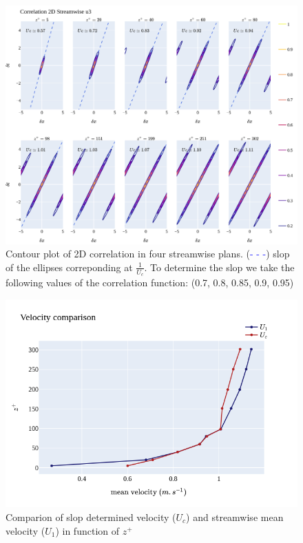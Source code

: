 \documentclass[]{article}
\theoremstyle{plain}
\theoremstyle{remark}
\begin{document}
\begin{figure}[H]
	\begin{center}
		\includegraphics[width=\textwidth]{../../output/figures/channel_wrles_retau395/split_time/frozen_turbulence/correlation2D/u3_all.png}
		\caption{Contour plot of 2D correlation in four streamwise plans. (\textcolor{blue}{- - -}) slop of the ellipses correponding at $\frac{1}{U_c}$. To determine the slop we take the following values of the correlation function: (0.7, 0.8, 0.85, 0.9, 0.95)}
	\end{center}
\end{figure}

\begin{figure}[H]
	\begin{center}
		\includegraphics[width=\textwidth]{../../output/figures/channel_wrles_retau395/split_time/frozen_turbulence/correlation2D/u_1c_all.png}
		\caption{Comparion of slop determined velocity ($U_c$) and streamwise mean velocity ($U_1$) in function of $z^+$}
	\end{center}
\end{figure}
\end{document}
